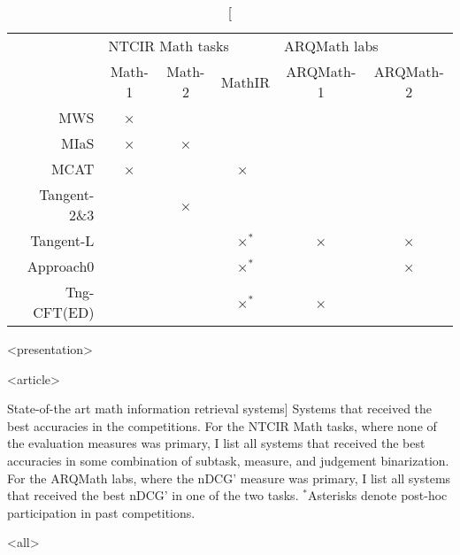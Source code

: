 \begin{table}
\centering
\begin{tabular}{@{}rccccc@{}}
\toprule
             & \multicolumn{3}{l}{NTCIR Math tasks} & \multicolumn{2}{l}{ARQMath labs} \\
             & Math-1 & Math-2 & MathIR             & ARQMath-1 & ARQMath-2            \\
\midrule
MWS          &    ×   &        &                    &           &                      \\
MIaS         &    ×   &    ×   &                    &           &                      \\
MCAT         &    ×   &        &    ×$\phantom{^{\text{*}}}$ &  &                      \\
Tangent-2\&3 &        &    ×   &                    &           &                      \\
Tangent-L    &        &        &    ×$^{\text{*}}$  &    ×      &     ×                \\
Approach0    &        &        &    ×$^{\text{*}}$  &           &     ×                \\
Tng-CFT(ED)  &        &        &    ×$^{\text{*}}$  &    ×      &                      \\
\bottomrule
\end{tabular}

\mode
<presentation>

\caption
  {Systems that received the best accuracies in the shared task evaluations.\newline$^{\text{*}}$Asterisks denote
   post-hoc participation in past competitions.}

\mode
<article>

\caption
  [State-of-the art math information retrieval systems]%
  {Systems that received the best accuracies in the competitions.
   For the NTCIR Math tasks, where none of the evaluation measures was
   primary, I list all systems that received the best accuracies in some
   combination of subtask, measure, and judgement binarization. For the ARQMath
   labs, where the nDCG' measure was primary, I list all systems that received
   the best nDCG' in one of the two tasks. $^{\text{*}}$Asterisks denote
   post-hoc participation in past competitions.}

\protect{}
\protect{}

\mode
<all>

\label{tab:systems}
\end{table}
